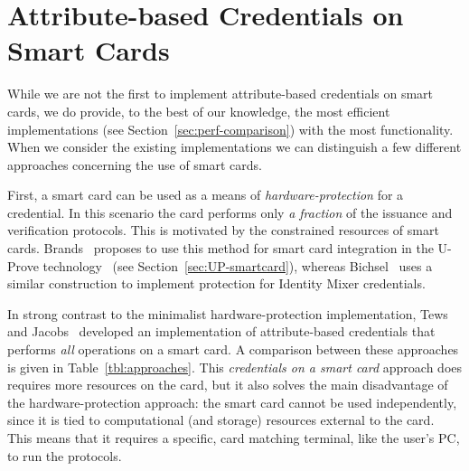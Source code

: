 \section{Attribute-based Credentials on Smart Cards}

While we are not the first to implement attribute-based credentials on smart
cards, we do provide, to the best of our knowledge, the most efficient
implementations (see Section~\ref{sec:perf-comparison}) with the most
functionality. When we consider the existing implementations we can distinguish
a few different approaches concerning the use of smart cards.

First, a smart card can be used as a means of \emph{hardware-protection} for a
credential. In this scenario the card performs only \emph{a fraction} of the
issuance and verification protocols. This is motivated by the constrained
resources of smart cards. Brands~\cite[Chapter 6]{Brands2000} proposes to use
this method for smart card integration in the U-Prove
technology~\cite{U-Prove_Overview2011} (see Section~\ref{sec:UP-smartcard}),
whereas Bichsel~\cite{Bichsel2007} uses a similar construction to implement
protection for Identity Mixer credentials.

In strong contrast to the minimalist hardware-protection implementation, Tews
and Jacobs~\cite{TewsJacobs09} developed an implementation of attribute-based
credentials that performs \emph{all} operations on a smart card. A comparison
between these approaches is given in Table~\ref{tbl:approaches}. This
\emph{credentials on a smart card} approach does requires more resources on the
card, but it also solves the main disadvantage of the hardware-protection
approach: the smart card cannot be used independently, since it is tied to
computational (and storage) resources external to the card. This means that it
requires a specific, card matching terminal, like the user's PC, to run
the protocols.

